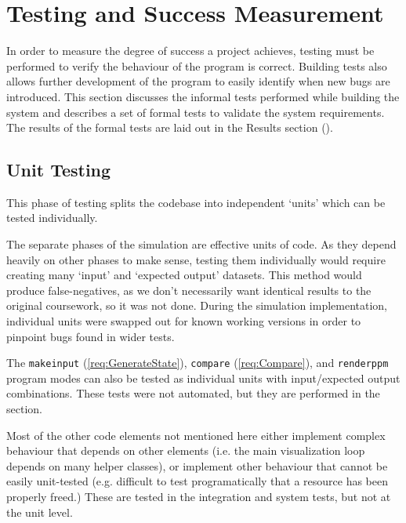 
\chapter{Testing and Success Measurement}
\label{sec:Testing}
In order to measure the degree of success a project achieves, testing must be performed to verify the behaviour of the program is correct.
Building tests also allows further development of the program to easily identify when new bugs are introduced.
This section discusses the informal tests performed while building the system and describes a set of formal tests to validate the system requirements.
The results of the formal tests are laid out in the Results section ().

\section{Unit Testing}
This phase of testing splits the codebase into independent `units' which can be tested individually.


The separate phases of the simulation are effective units of code.
As they depend heavily on other phases to make sense, testing them individually would require creating many `input' and `expected output' datasets.
This method would produce false-negatives, as we don't necessarily want identical results to the original coursework, so it was not done.
During the simulation implementation, individual units were swapped out for known working versions in order to pinpoint bugs found in wider tests.

The \texttt{makeinput} (\cref{req:GenerateState}), \texttt{compare} (\cref{req:Compare}), and \texttt{renderppm} program modes can also be tested as individual units with input/expected output combinations.
These tests were not automated, but they are performed in the  section.

Most of the other code elements not mentioned here either implement complex behaviour that depends on other elements (i.e. the main visualization loop depends on many helper classes), or implement other behaviour that cannot be easily unit-tested (e.g. difficult to test programatically that a resource has been properly freed.)
These are tested in the integration and system tests, but not at the unit level.

